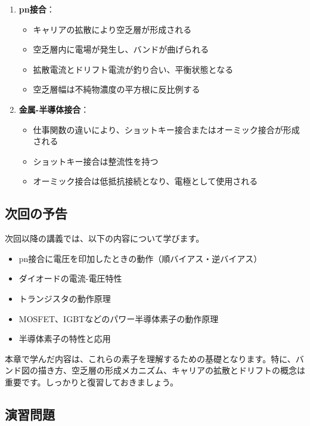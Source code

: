 \begin{enumerate}
\item \textbf{pn接合}：
\begin{itemize}
\item キャリアの拡散により空乏層が形成される
\item 空乏層内に電場が発生し、バンドが曲げられる
\item 拡散電流とドリフト電流が釣り合い、平衡状態となる
\item 空乏層幅は不純物濃度の平方根に反比例する
\end{itemize}

\item \textbf{金属-半導体接合}：
\begin{itemize}
\item 仕事関数の違いにより、ショットキー接合またはオーミック接合が形成される
\item ショットキー接合は整流性を持つ
\item オーミック接合は低抵抗接続となり、電極として使用される
\end{itemize}
\end{enumerate}

\subsection{次回の予告}

次回以降の講義では、以下の内容について学びます。

\begin{itemize}
\item pn接合に電圧を印加したときの動作（順バイアス・逆バイアス）
\item ダイオードの電流-電圧特性
\item トランジスタの動作原理
\item MOSFET、IGBTなどのパワー半導体素子の動作原理
\item 半導体素子の特性と応用
\end{itemize}

本章で学んだ内容は、これらの素子を理解するための基礎となります。特に、バンド図の描き方、空乏層の形成メカニズム、キャリアの拡散とドリフトの概念は重要です。しっかりと復習しておきましょう。

\subsection{演習問題}


